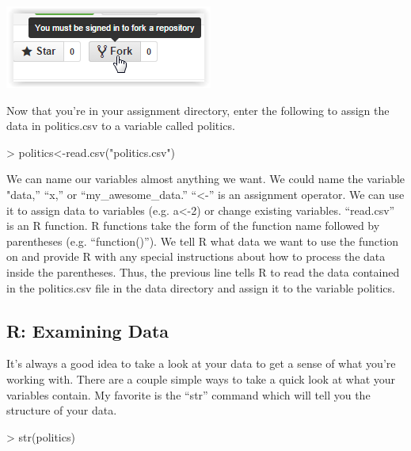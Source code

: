 \documentclass[12pt]{article}
\begin{document}
\includegraphics{imgs/R10.PNG}

Now that you're in your assignment directory, enter the following to assign
the data in politics.csv to a variable called politics.

\begin{Schunk}
\begin{Sinput}
> politics<-read.csv("politics.csv")
\end{Sinput}
\end{Schunk}

We can name our variables almost anything we want. We could name the variable
"data,'' ``x,'' or ``my\_awesome\_data.'' ``<-'' is an assignment operator. We
can use it to assign data to variables (e.g. a<-2) or change existing variables.
``read.csv'' is an R function. R functions take the form of the function name
followed by parentheses (e.g. ``function()''). We tell R what data we want to
use the function on and provide R with any special instructions about how to
process the data inside the parentheses. Thus, the previous line tells R to
read the data contained in the politics.csv file in the data directory and
assign it to the variable politics.

\subsection{R: Examining Data}
It's always a good idea to take a look at your data to get a sense of what you're
working with. There are a couple simple ways to take a quick look at what your
variables contain. My favorite is the ``str'' command which will tell you the 
structure of your data.

\begin{Schunk}
\begin{Sinput}
> str(politics)
\end{Sinput}
\end{Schunk}
\end{document}
